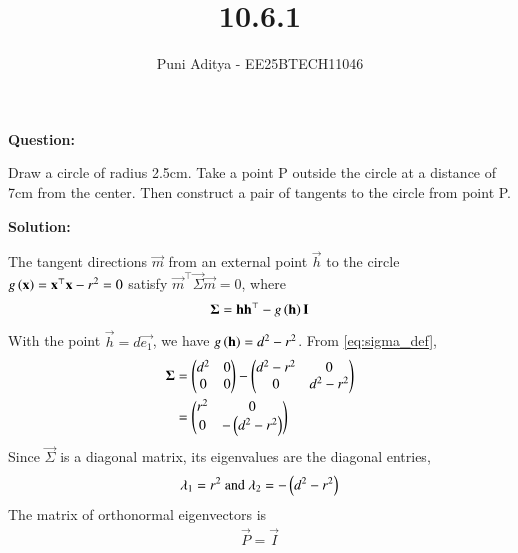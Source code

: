 \documentclass[journal]{IEEEtran}
\begin{document}
\title{10.6.1}
\author{Puni Aditya - EE25BTECH11046}
\maketitle

\textbf{Question:}

Draw a circle of radius 2.5cm. Take a point P outside the circle at a distance of 7cm from the center. Then construct a pair of tangents to the circle from point P.

\textbf{Solution:}

The tangent directions $\vec{m}$ from an external point $\vec{h}$ to the circle $g\left(\mathbf{x}\right)=\mathbf{x}^\top\mathbf{x}-r^2=0$ satisfy $\vec{m}^\top\vec{\Sigma}\vec{m} = 0$, where
\begin{align}
    \mathbf{\Sigma} = \mathbf{h}\mathbf{h}^\top - g\left(\mathbf{h}\right)\mathbf{I} \label{eq:sigma_def}
\end{align}
With the point $\vec{h}=d\vec{e_1}$, we have $g\left(\mathbf{h}\right) = d^2-r^2$. From \eqref{eq:sigma_def},
\begin{align}
    \mathbf{\Sigma} &= \begin{pmatrix}d^2 & 0 \\ 0 & 0\end{pmatrix} - \begin{pmatrix}d^2-r^2 & 0 \\ 0 & d^2-r^2\end{pmatrix} \nonumber \\
    &= \begin{pmatrix}r^2 & 0 \\ 0 & -\left(d^2-r^2\right)\end{pmatrix}
\end{align}
Since $\vec{\Sigma}$ is a diagonal matrix, its eigenvalues are the diagonal entries, 
\begin{align}
	\lambda_1 = r^2\text{ and }\lambda_2 = -\left(d^2-r^2\right)
\end{align}
The matrix of orthonormal eigenvectors is 
\begin{align}
	\vec{P}=\vec{I}
\end{align}
\end{document}
